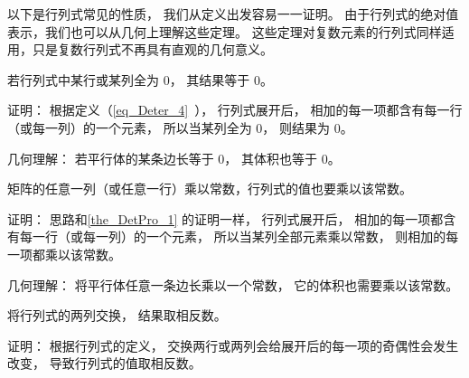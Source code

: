 


以下是行列式常见的性质， 我们从定义出发容易一一证明。 由于行列式的绝对值表示，我们也可以从几何上理解这些定理。 这些定理对复数元素的行列式同样适用，只是复数行列式不再具有直观的几何意义。

\begin{theorem}{ } \label{the_DetPro_1}
若行列式中某行或某列全为 0， 其结果等于 0。
\end{theorem}
证明： 根据定义（\autoref{eq_Deter_4}~）， 行列式展开后， 相加的每一项都含有每一行（或每一列）的一个元素， 所以当某列全为 0， 则结果为 0。

几何理解： 若平行体的某条边长等于 0， 其体积也等于 0。

\begin{theorem}{ } \label{the_DetPro_3}
矩阵的任意一列（或任意一行）乘以常数，行列式的值也要乘以该常数。
\end{theorem}
证明： 思路和\autoref{the_DetPro_1} 的证明一样， 行列式展开后， 相加的每一项都含有每一行（或每一列）的一个元素， 所以当某列全部元素乘以常数， 则相加的每一项都乘以该常数。

几何理解： 将平行体任意一条边长乘以一个常数， 它的体积也需要乘以该常数。

\begin{theorem}{ }\label{the_DetPro_6}
将行列式的两列交换， 结果取相反数。
\end{theorem}
证明： 根据行列式的定义， 交换两行或两列会给展开后的每一项的奇偶性会发生改变， 导致行列式的值取相反数。


